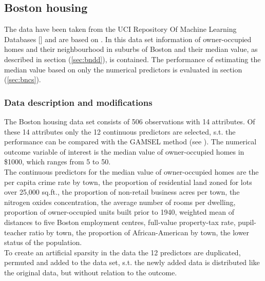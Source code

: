 \documentclass[12pt,letterpaper]{article}
\numberwithin{equation}{subsection}
\begin{document}
\subsection{Boston housing}
\label{sec:bn}
The data have been taken from the UCI Repository Of Machine Learning Databases [\cite{uci}] and are based on \cite{boston}. In this data set information of owner-occupied homes and their neighbourhood in suburbs of Boston and their median value, as described in section (\ref{sec:bndd}), is contained. The performance of estimating the median value based on only the numerical predictors is evaluated in section (\ref{sec:bncs}). 
\subsubsection{Data description and modifications}
The Boston housing data set consists of 506 observations with 14 attributes. Of these 14 attributes only the 12 continuous predictors are selected, s.t. the performance can be compared with the GAMSEL method (see \cite{gamsel}). The numerical outcome variable of interest is the median value of owner-occupied homes in \$1000, which ranges from 5 to 50.  \\
The continuous predictors for the median value of owner-occupied homes are the per capita crime rate by town, the proportion of residential land zoned for lots over 25,000 sq.ft., the proportion of non-retail business acres per town, 
the nitrogen oxides concentration, the average number of rooms per dwelling, 
proportion of owner-occupied units built prior to 1940, weighted mean of distances to five Boston employment centres, full-value property-tax rate, 
pupil-teacher ratio by town, the proportion of African-American by town, the lower status of the population. \\
To create an artificial sparsity in the data the 12 predictors are duplicated, permuted and added to the data set, s.t. the newly added data is distributed like the original data, but without relation to the outcome.
\label{sec:bndd}
\end{document}

